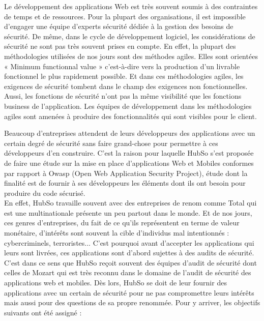 \begin{itemize}
	\itemtirait Le développement des applications Web est très souvent soumis à des contraintes de temps et de ressources. Pour la plupart des organisations, il est impossible d’engager une équipe d’experts sécurité dédiée à la gestion des besoins de sécurité. De même, dans le cycle de développement logiciel, les considérations de sécurité ne sont pas très souvent prises en compte. En effet, la plupart des méthodologies utilisées de nos jours sont des méthodes agiles. Elles sont orientées « Minimum functionnal value » c'est-à-dire vers la production d'un livrable fonctionnel le plus rapidement possible. Et dans ces méthodologies agiles, les exigences de sécurité tombent dans le champ des exigences non fonctionnelles. Aussi, les fonctions de sécurité n’ont pas la même visibilité que les fonctions business de l’application. Les équipes de développement dans les méthodologies agiles sont amenées à produire des fonctionnalités qui sont visibles pour le client.
\end{itemize}
Beaucoup d’entreprises attendent de leurs développeurs des applications avec un certain degré de sécurité sans faire grand-chose pour permettre à ces développeurs d’en construire. C'est la raison pour laquelle HubSo s'est proposée de faire une étude sur la mise en place d'applications Web et Mobiles conformes par rapport à Owasp (Open Web Application Security Project),  étude dont la finalité est de fournir à ses développeurs les éléments dont ils ont besoin pour produire du code sécurisé. \\
En effet, HubSo travaille souvent avec des entreprises de renom comme Total qui est une multinationale présente un peu partout dans le monde. Et de nos jours, ces genres d'entreprises, du fait de ce qu'ils représentent en terme de valeur monétaire, d'intérêts sont souvent la cible d'individus mal intentionnés : cybercriminels, terroristes... C'est pourquoi avant d'accepter les applications qui leurs sont livrées, ces applications sont d'abord sujettes à des audits de sécurité. C'est dans ce sens que HubSo reçoit souvent des équipes d'audit de sécurité dont celles de Mozart qui est très reconnu dans le domaine de l'audit de sécurité des applications web et mobiles. Dès lors, HubSo se doit de leur fournir des applications avec un certain de sécurité pour ne pas compromettre leurs intérêts mais aussi pour des questions de sa propre renommée.
Pour y arriver, les objectifs suivants ont été assigné :
